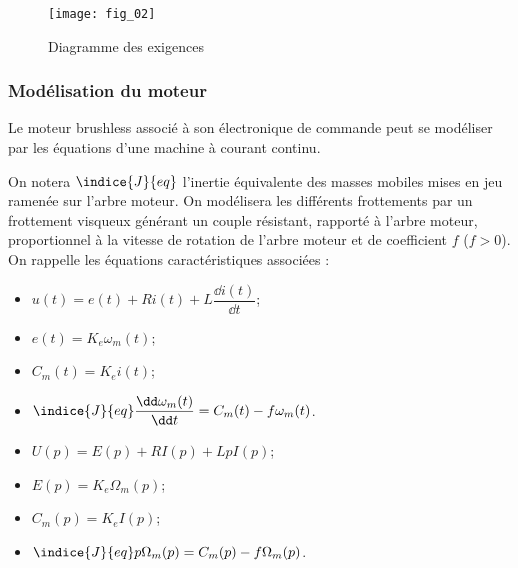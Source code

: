 \begin{figure}[H]
\centering
\texttt{[image: fig\_02]}
\caption{Diagramme des exigences \label{fig_02}}
\end{figure}
\fi


\subsubsection*{Modélisation du moteur}

\ifprof
\else

Le moteur brushless associé à son électronique de commande peut se modéliser par les équations d’une machine à courant continu. 


On notera $\indice{J}{eq}$ l’inertie équivalente des masses mobiles mises en jeu ramenée sur l’arbre moteur. On
modélisera les différents frottements par un frottement visqueux générant un couple résistant, rapporté
à l’arbre moteur, proportionnel à la vitesse de rotation de l’arbre moteur et de coefficient $f$ ($f > 0$).
On rappelle les équations caractéristiques associées :
\begin{itemize}
\item $u(t) = e(t)+Ri(t)+L\dfrac{\dd i(t)}{\dd t}$;
\item $e(t)=K_e\omega_m(t)$;
\item $C_m(t)=K_e i(t)$;
\item $\indice{J}{eq} \dfrac{\dd \omega_m(t)}{\dd t} = C_m(t)-f\omega_m(t)$.
\end{itemize}
\fi


\ifprof
\begin{corrige}
\begin{itemize}
\item $U(p) = E(p)+RI(p)+Lp I(p)$;
\item $E(p)=K_e\Omega_m(p)$;
\item $C_m(p)=K_e I(p)$;
\item $\indice{J}{eq} p\Omega_m(p) = C_m(p)-f\Omega_m(p)$.
\end{itemize}
\end{corrige}
\else
\fi

